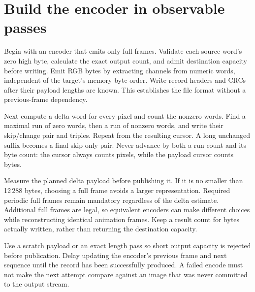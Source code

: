 \section{Build the encoder in observable passes}
Begin with an encoder that emits only full frames. Validate each source word's zero
high byte, calculate the exact output count, and admit destination capacity before
writing. Emit RGB bytes by extracting channels from numeric words, independent of
the target's memory byte order. Write record headers and CRCs after their payload
lengths are known. This establishes the file format without a previous-frame dependency.

Next compute a delta word for every pixel and count the nonzero words. Find a maximal
run of zero words, then a run of nonzero words, and write their skip/change pair and
triples. Repeat from the resulting cursor. A long unchanged suffix becomes a final
skip-only pair. Never advance by both a run count and its byte count: the cursor
always counts pixels, while the payload cursor counts bytes.

Measure the planned delta payload before publishing it. If it is no smaller than
12\,288 bytes, choosing a full frame avoids a larger representation. Required
periodic full frames remain mandatory regardless of the delta estimate. Additional
full frames are legal, so equivalent encoders can make different choices while
reconstructing identical animation frames. Keep a result count for bytes actually
written, rather than returning the destination capacity.

Use a scratch payload or an exact length pass so short output capacity is rejected
before publication. Delay updating the encoder's previous frame and next sequence
until the record has been successfully produced. A failed encode must not make the
next attempt compare against an image that was never committed to the output stream.
